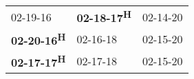 \begin{supertabular}{lll}
           02-19-16\textsuperscript{} &  \textbf{02-18-17\textsuperscript{H}} &  02-14-20\textsuperscript{} \\
 \textbf{02-20-16\textsuperscript{H}} &            02-16-18\textsuperscript{} &  02-15-20\textsuperscript{} \\
 \textbf{02-17-17\textsuperscript{H}} &            02-17-18\textsuperscript{} &  02-15-20\textsuperscript{} \\
\end{supertabular}
